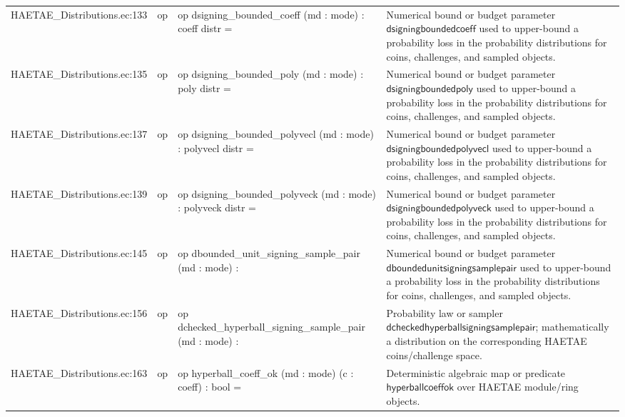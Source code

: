 \documentclass[10pt]{article}
\begin{document}
\begin{longtable}{L{0.11\textwidth}L{0.055\textwidth}L{0.385\textwidth}L{0.41\textwidth}}
HAETAE\_\allowbreak{}Distributions.\allowbreak{}ec:\allowbreak{}133 & op & {\ttfamily\scriptsize op dsigning\_\allowbreak{}bounded\_\allowbreak{}coeff (md : mode) : coeff distr =} & Numerical bound or budget parameter $\mathsf{dsigningboundedcoeff}$ used to upper-bound a probability loss in the probability distributions for coins, challenges, and sampled objects. \\
HAETAE\_\allowbreak{}Distributions.\allowbreak{}ec:\allowbreak{}135 & op & {\ttfamily\scriptsize op dsigning\_\allowbreak{}bounded\_\allowbreak{}poly (md : mode) : poly distr =} & Numerical bound or budget parameter $\mathsf{dsigningboundedpoly}$ used to upper-bound a probability loss in the probability distributions for coins, challenges, and sampled objects. \\
HAETAE\_\allowbreak{}Distributions.\allowbreak{}ec:\allowbreak{}137 & op & {\ttfamily\scriptsize op dsigning\_\allowbreak{}bounded\_\allowbreak{}polyvecl (md : mode) : polyvecl distr =} & Numerical bound or budget parameter $\mathsf{dsigningboundedpolyvecl}$ used to upper-bound a probability loss in the probability distributions for coins, challenges, and sampled objects. \\
HAETAE\_\allowbreak{}Distributions.\allowbreak{}ec:\allowbreak{}139 & op & {\ttfamily\scriptsize op dsigning\_\allowbreak{}bounded\_\allowbreak{}polyveck (md : mode) : polyveck distr =} & Numerical bound or budget parameter $\mathsf{dsigningboundedpolyveck}$ used to upper-bound a probability loss in the probability distributions for coins, challenges, and sampled objects. \\
HAETAE\_\allowbreak{}Distributions.\allowbreak{}ec:\allowbreak{}145 & op & {\ttfamily\scriptsize op dbounded\_\allowbreak{}unit\_\allowbreak{}signing\_\allowbreak{}sample\_\allowbreak{}pair (md : mode) :} & Numerical bound or budget parameter $\mathsf{dboundedunitsigningsamplepair}$ used to upper-bound a probability loss in the probability distributions for coins, challenges, and sampled objects. \\
HAETAE\_\allowbreak{}Distributions.\allowbreak{}ec:\allowbreak{}156 & op & {\ttfamily\scriptsize op dchecked\_\allowbreak{}hyperball\_\allowbreak{}signing\_\allowbreak{}sample\_\allowbreak{}pair (md : mode) :} & Probability law or sampler $\mathsf{dcheckedhyperballsigningsamplepair}$; mathematically a distribution on the corresponding HAETAE coins/challenge space. \\
HAETAE\_\allowbreak{}Distributions.\allowbreak{}ec:\allowbreak{}163 & op & {\ttfamily\scriptsize op hyperball\_\allowbreak{}coeff\_\allowbreak{}ok (md : mode) (c : coeff) : bool =} & Deterministic algebraic map or predicate $\mathsf{hyperballcoeffok}$ over HAETAE module/ring objects. \\

\end{longtable}
\end{document}
